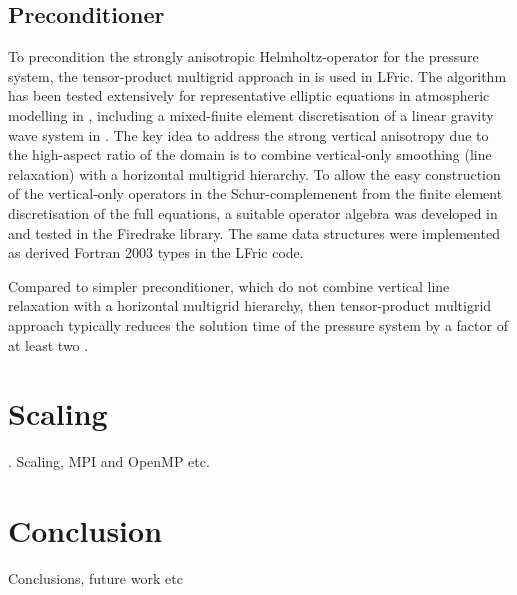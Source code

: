 \documentclass[times]{elsarticle}
\begin{document}
\subsection{\label{sec:preconditioner}Preconditioner}
To precondition the strongly anisotropic Helmholtz-operator for the pressure system, the tensor-product multigrid approach in \cite{Borm2001} is used in LFric. The algorithm has been tested extensively for representative elliptic equations in atmospheric modelling in \cite{Mueller2014,Dedner2016}, including a mixed-finite element discretisation of a linear gravity wave system in \cite{Mitchell2016}. The key idea to address the strong vertical anisotropy due to the high-aspect ratio of the domain is to combine vertical-only smoothing (line relaxation) with a horizontal multigrid hierarchy. To allow the easy construction of the vertical-only operators in the Schur-complemenent from the finite element discretisation of the full equations, a suitable operator algebra was developed in \cite{Mitchell2016} and tested in the Firedrake library. The same data structures were implemented as derived Fortran 2003 types in the LFric code.

Compared to simpler preconditioner, which do not combine vertical line relaxation with a horizontal multigrid hierarchy, then tensor-product multigrid approach typically reduces the solution time of the pressure system by a factor of at least two \cite{Mueller2014,Mitchell2016}.
\section{\label{sec:scal}Scaling}.
Scaling, MPI and OpenMP etc.

\section{Conclusion}
\label{sec:con}
Conclusions, future work etc



\end{document}
